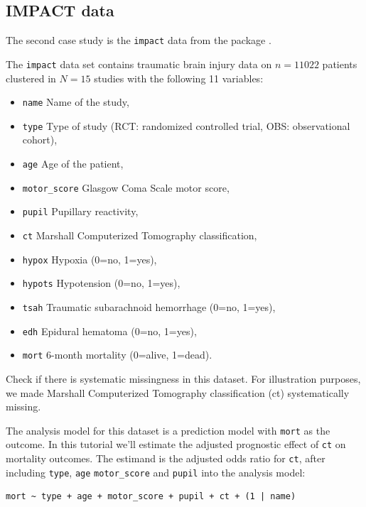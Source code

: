 \documentclass[
  article]{jss}
\providecommand{\tightlist}{%
  \setlength{\itemsep}{0pt}\setlength{\parskip}{0pt}}\usepackage{longtable,booktabs,array}
\begin{document}
\hypertarget{sec-impact}{%
\subsection{IMPACT data}\label{sec-impact}}

The second case study is the \texttt{impact} data from the
 package \citep[empirical data on traumatic brain
injuries, \(n = 11,022\) units across \(N = 15\) clusters,][]{metamisc}.

The \texttt{impact} data set contains traumatic brain injury data on
\(n = 11022\) patients clustered in \(N = 15\) studies with the
following 11 variables:

\begin{itemize}
\tightlist
\item
  \texttt{name} Name of the study,
\item
  \texttt{type} Type of study (RCT: randomized controlled trial, OBS:
  observational cohort),
\item
  \texttt{age} Age of the patient,
\item
  \texttt{motor\_score} Glasgow Coma Scale motor score,
\item
  \texttt{pupil} Pupillary reactivity,
\item
  \texttt{ct} Marshall Computerized Tomography classification,
\item
  \texttt{hypox} Hypoxia (0=no, 1=yes),
\item
  \texttt{hypots} Hypotension (0=no, 1=yes),
\item
  \texttt{tsah} Traumatic subarachnoid hemorrhage (0=no, 1=yes),
\item
  \texttt{edh} Epidural hematoma (0=no, 1=yes),
\item
  \texttt{mort} 6-month mortality (0=alive, 1=dead).
\end{itemize}

Check if there is systematic missingness in this dataset. For
illustration purposes, we made Marshall Computerized Tomography
classification (ct) systematically missing.

The analysis model for this dataset is a prediction model with
\texttt{mort} as the outcome. In this tutorial we'll estimate the
adjusted prognostic effect of \texttt{ct} on mortality outcomes. The
estimand is the adjusted odds ratio for \texttt{ct}, after including
\texttt{type}, \texttt{age} \texttt{motor\_score} and \texttt{pupil}
into the analysis model:

\begin{verbatim}
mort ~ type + age + motor_score + pupil + ct + (1 | name) 
\end{verbatim}
\end{document}
